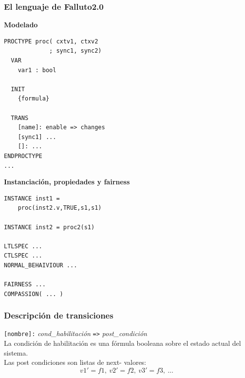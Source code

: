\documentclass[serif]{beamer}
\begin{document}
\begin{frame}[fragile]
\frametitle{El lenguaje de Falluto2.0}
{\fontsize{8pt}{10pt}\selectfont
\begin{minipage}{0.5\textwidth}
{\large \bfseries Modelado}
\begin{framed} 
\begin{verbatim}
PROCTYPE proc( cxtv1, ctxv2 
             ; sync1, sync2)
  VAR
    var1 : bool
   
  INIT
    {formula}

  TRANS
    [name]: enable => changes
    [sync1] ...
    []: ...
ENDPROCTYPE
...
\end{verbatim}
\end{framed}
\end{minipage}
\hspace{0.04\textwidth}
\begin{minipage}{0.44\textwidth}
{\large \bfseries Instanciación, propiedades y fairness}
\begin{framed}
\begin{verbatim}
INSTANCE inst1 =
    proc(inst2.v,TRUE,s1,s1)

INSTANCE inst2 = proc2(s1)

LTLSPEC ...
CTLSPEC ...
NORMAL_BEHAIVIOUR ...

FAIRNESS ...
COMPASSION( ... )

\end{verbatim}
\end{framed}
\end{minipage}
} %

\end{frame}



\begin{frame}
\frametitle{Descripción de transiciones}
\texttt{[nombre]:} \textit{cond\_habilitación} \texttt{=>} \textit{post\_condición}\\[0.5cm]
La condición de habilitación es una fórmula
booleana sobre el estado actual del sistema.\\[0.5cm]
Las post condiciones son listas de next-
valores: $$v1' = f1,~v2' = f2,~v3' = f3,~...$$
\end{frame}
\end{document}
